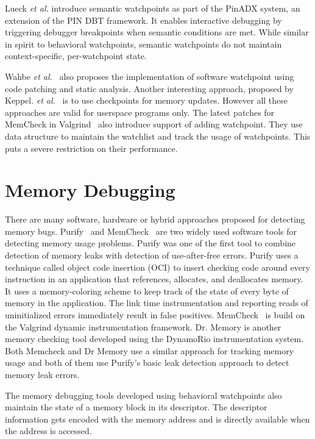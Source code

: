 Lueck \emph{et al.} \cite{PinADX} introduce semantic watchpoints as part of the PinADX system, an extension of the PIN DBT framework. 
It enables interactive debugging by triggering debugger breakpoints when semantic conditions are met. While similar in spirit to behavioral watchpoints, semantic watchpoints do not maintain context-specific, per-watchpoint state. 

Wahbe \emph{et al.}~\cite{Wahbe:1992} also proposes the implementation of software watchpoint using code patching and static analysis. %
Another interesting approach, proposed by Keppel. \emph{et al.}~\cite{Keppel:93a} is to use checkpoints for memory updates. However all these approaches are valid for userspace programs only. The latest patches for MemCheck in Valgrind~\cite{Seward:2005} also introduce
support of adding watchpoint. They use data structure to maintain the watchlist and track the usage of watchpoints. This puts a severe restriction on their performance.   


\section{Memory Debugging}
There are many software, hardware or hybrid approaches proposed for detecting memory bugs. Purify~\cite{Rs_purify:fast} and MemCheck~\cite{Nethercote:2007:SBM:1254810.1254820} are two widely used software tools for detecting memory usage problems. Purify was one of the first tool to combine detection of memory leaks with detection of use-after-free errors. Purify uses a technique called object code insertion (OCI) to insert checking code around every instruction in an application that references, allocates, and deallocates memory. It uses a memory-coloring scheme to keep track of the state of every byte of memory in the application. The link time instrumentation and reporting reads of uninitialized errors immediately result in false positives. MemCheck~\cite{Nethercote:2007:SBM:1254810.1254820} is build on the Valgrind dynamic instrumentation framework. Dr. Memory is another memory checking tool developed using the DynamoRio instrumentation system. Both Memcheck and Dr Memory use a similar approach for tracking memory usage and both of them use Purify’s basic leak detection approach to detect memory leak errors.

The memory debugging tools developed using behavioral watchpoints also maintain the state of a memory block in its descriptor. The descriptor information gets encoded with the memory address and is directly available when the address is accessed.


